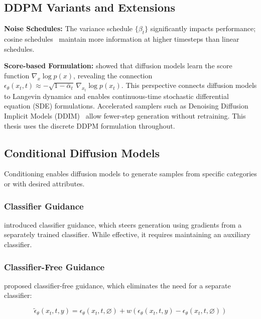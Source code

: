 \subsection{DDPM Variants and Extensions}
\label{sec:bg:diffusion:variants}

\textbf{Noise Schedules:} The variance schedule $\{\beta_t\}$ significantly impacts performance; cosine schedules~\cite{nichol2021improved} maintain more information at higher timesteps than linear schedules.

\textbf{Score-based Formulation:} \textcite{song2021score} showed that diffusion models learn the score function $\nabla_x \log p(x)$, revealing the connection $\epsilon_\theta(x_t, t) \approx -\sqrt{1 - \bar{\alpha}_t}\, \nabla_{x_t} \log p(x_t)$. This perspective connects diffusion models to Langevin dynamics and enables continuous-time stochastic differential equation (SDE) formulations. Accelerated samplers such as Denoising Diffusion Implicit Models (DDIM)~\cite{song2021denoising} allow fewer-step generation without retraining. This thesis uses the discrete DDPM formulation throughout.

\subsection{Conditional Diffusion Models}
\label{sec:bg:diffusion:conditional}

Conditioning enables diffusion models to generate samples from specific categories or with desired attributes.

\subsubsection{Classifier Guidance}
\label{sec:bg:diffusion:classifier-guidance}

\textcite{dhariwal2021diffusion} introduced classifier guidance, which steers generation using gradients from a separately trained classifier. While effective, it requires maintaining an auxiliary classifier.

\subsubsection{Classifier-Free Guidance}
\label{sec:bg:diffusion:classifier-free}

\textcite{ho2022classifierfree} proposed classifier-free guidance, which eliminates the need for a separate classifier:

\begin{equation}
\label{eq:bg:cfg}
\tilde{\epsilon}_\theta(x_t, t, y) = \epsilon_\theta(x_t, t, \varnothing) + w \left( \epsilon_\theta(x_t, t, y) - \epsilon_\theta(x_t, t, \varnothing) \right)
\end{equation}

